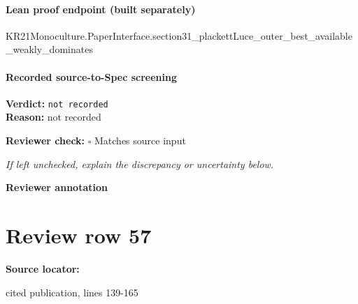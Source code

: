 \documentclass[10pt]{article}
\newcommand{\reviewerbox}{%
  \par\noindent\fbox{\parbox{0.96\linewidth}{\rule{0pt}{0.38in}}}\par
}
\newcommand{\reviewmatch}[1]{%
  \par\noindent\textbf{Reviewer check:} $\square$\; #1\par
  \noindent\emph{If left unchecked, explain the discrepancy or uncertainty below.}\par
}
\begin{document}
\paragraph{Lean proof endpoint (built separately)}\begin{ReviewVerbatim}
KR21Monoculture.PaperInterface.section31_plackettLuce_outer_best_available_weakly_dominates
\end{ReviewVerbatim}

\paragraph{Recorded source-to-Spec screening}
\textbf{Verdict:} \texttt{not recorded}
\\
\textbf{Reason:} not recorded
\reviewmatch{Matches source input}
\noindent\textbf{Reviewer annotation}\par
\reviewerbox
\clearpage
\hypertarget{source-claim-4cfc28215a7bcccf}{}
\section*{Review row 57}
\textbf{Source locator:} {\footnotesize\raggedright cited publication, lines 139-\allowbreak{}165\par}
\end{document}

